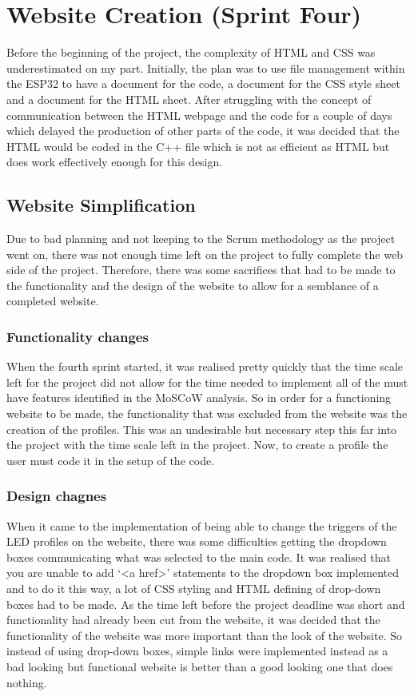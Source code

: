 \section {Website Creation (Sprint Four)}
Before the beginning of the project, the complexity of HTML and CSS was underestimated on my part. Initially, the plan was to use file management within the ESP32 to have a document for the code, a document for the CSS style sheet and a document for the HTML sheet. After struggling with the concept of communication between the HTML webpage and the code for a couple of days which delayed the production of other parts of the code, it was decided that the HTML would be coded in the C++ file which is not as efficient as HTML but does work effectively enough for this design. 

\subsection{Website Simplification}
Due to bad planning and not keeping to the Scrum methodology as the project went on, there was not enough time left on the project to fully complete the web side of the project. Therefore, there was some sacrifices that had to be made to the functionality and the design of the website to allow for a semblance of a completed website.

\subsubsection{Functionality changes}
When the fourth sprint started, it was realised pretty quickly that the time scale left for the project did not allow for the time needed to implement all of the must have features identified in the MoSCoW analysis. So in order for a functioning website to be made, the functionality that was excluded from the website was the creation of the profiles. This was an undesirable but necessary step this far into the project with the time scale left in the project. Now, to create a profile the user must code it in the setup of the code. 

\subsubsection{Design chagnes}
When it came to the implementation of being able to change the triggers of the LED profiles on the website, there was some difficulties getting the dropdown boxes communicating what was selected to the main code. It was realised that you are unable to add ‘<a href>’ statements to the dropdown box implemented and to do it this way, a lot of CSS styling and HTML defining of drop-down boxes had to be made. As the time left before the project deadline was short and functionality had already been cut from the website, it was decided that the functionality of the website was more important than the look of the website. So instead of using drop-down boxes, simple links were implemented instead as a bad looking but functional website is better than a good looking one that does nothing.  

